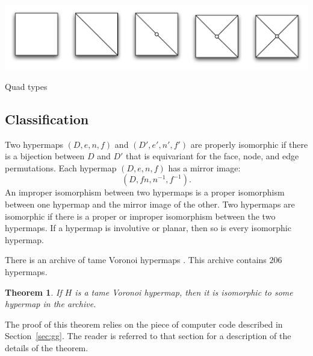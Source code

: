 \documentclass{article} %
\newtheorem{theorem}{Theorem}[section]
\begin{document}
\begin{Figure}[htb]
  \begin{center}
    \includegraphics[scale=0.50]{images/quadtype.pdf}
   \end{center}
  \caption{Quad types}
  \label{fig:quadtype}
\end{Figure}




\subsection{Classification}\label{sec:class}


Two hypermaps $(D,e,n,f)$ and $(D',e',n',f')$ are properly isomorphic if there
is a bijection between $D$ and $D'$ that is equivariant for the face, node, and
edge permutations.  Each hypermap $(D,e,n,f)$ has a mirror image:
  $$
  (D,f n, n^{-1},f^{-1}).
  $$
  An improper
isomorphism between two hypermaps is a proper isomorphism between one hypermap and the
mirror image of the other.
Two hypermaps are isomorphic if there is a proper or improper isomorphism between
the two hypermaps. If a hypermap is involutive or planar, then so is every isomorphic
hypermap.


There is an archive of tame Voronoi hypermaps
\cite{McLaughlin:2008:KeplerCode}. This archive contains $206$
hypermaps.

\begin{theorem}\label{thm:class}  
If $H$ is a tame Voronoi hypermap, then it is isomorphic to
some hypermap in the archive.
\end{theorem}

The proof of this theorem relies on the piece of 
computer code described in Section~\ref{sec:gg}.  The reader is referred to that section
for a description of the details of the theorem.
\end{document}
